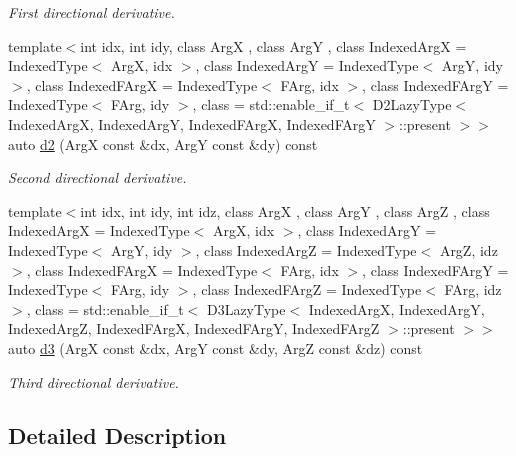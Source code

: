 \begin{DoxyCompactItemize}
\begin{DoxyCompactList}\small\item\em First directional derivative. \end{DoxyCompactList}\item 
{\footnotesize template$<$int idx, int idy, class ArgX , class ArgY , class Indexed\+ArgX  = Indexed\+Type$<$ Arg\+X, idx $>$, class Indexed\+ArgY  = Indexed\+Type$<$ Arg\+Y, idy $>$, class Indexed\+F\+ArgX  = Indexed\+Type$<$ F\+Arg, idx $>$, class Indexed\+F\+ArgY  = Indexed\+Type$<$ F\+Arg, idy $>$, class  = std\+::enable\+\_\+if\+\_\+t$<$ D2\+Lazy\+Type$<$ Indexed\+Arg\+X, Indexed\+Arg\+Y, Indexed\+F\+Arg\+X,                                                             Indexed\+F\+Arg\+Y $>$\+::present $>$$>$ }\\auto \hyperlink{structFunG_1_1MathematicalOperations_1_1Chain_a0ab88c09299ce967583408f7f7dcd2bb}{d2} (ArgX const \&dx, ArgY const \&dy) const 
\begin{DoxyCompactList}\small\item\em Second directional derivative. \end{DoxyCompactList}\item 
{\footnotesize template$<$int idx, int idy, int idz, class ArgX , class ArgY , class ArgZ , class Indexed\+ArgX  = Indexed\+Type$<$ Arg\+X, idx $>$, class Indexed\+ArgY  = Indexed\+Type$<$ Arg\+Y, idy $>$, class Indexed\+ArgZ  = Indexed\+Type$<$ Arg\+Z, idz $>$, class Indexed\+F\+ArgX  = Indexed\+Type$<$ F\+Arg, idx $>$, class Indexed\+F\+ArgY  = Indexed\+Type$<$ F\+Arg, idy $>$, class Indexed\+F\+ArgZ  = Indexed\+Type$<$ F\+Arg, idz $>$, class  = std\+::enable\+\_\+if\+\_\+t$<$                           D3\+Lazy\+Type$<$ Indexed\+Arg\+X, Indexed\+Arg\+Y, Indexed\+Arg\+Z, Indexed\+F\+Arg\+X,                                       Indexed\+F\+Arg\+Y, Indexed\+F\+Arg\+Z $>$\+::present $>$$>$ }\\auto \hyperlink{structFunG_1_1MathematicalOperations_1_1Chain_a17ac1618545b9d9bd2efa873b36cfbc7}{d3} (ArgX const \&dx, ArgY const \&dy, ArgZ const \&dz) const 
\begin{DoxyCompactList}\small\item\em Third directional derivative. \end{DoxyCompactList}\end{DoxyCompactItemize}


\subsection{Detailed Description}
